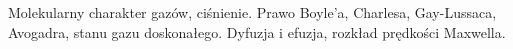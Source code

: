 Molekularny charakter gazów, ciśnienie.
Prawo Boyle'a, Charlesa, Gay-Lussaca, Avogadra, stanu gazu doskonałego.
Dyfuzja i efuzja, rozkład prędkości Maxwella.